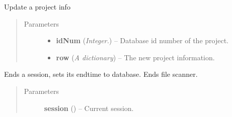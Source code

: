 \documentclass[letterpaper,10pt,english]{sphinxmanual}
\begin{document}

\begin{fulllineitems}
\label{controller:controller.EditProject}
Update a project info
\begin{quote}\begin{description}
\item[{Parameters}] \leavevmode\begin{itemize}
\item {} 
\textbf{idNum} (\emph{Integer.}) -- Database id number of the project.

\item {} 
\textbf{row} (\emph{A dictionary}) -- The new project information.

\end{itemize}

\end{description}\end{quote}

\end{fulllineitems}


\begin{fulllineitems}
\label{controller:controller.EndSession}
Ends a session, sets its endtime to database. Ends file scanner.
\begin{quote}\begin{description}
\item[{Parameters}] \leavevmode
\textbf{session} ({\hyperref[models:models.Session]{}}) -- Current session.

\end{description}\end{quote}

\end{fulllineitems}

\end{document}

